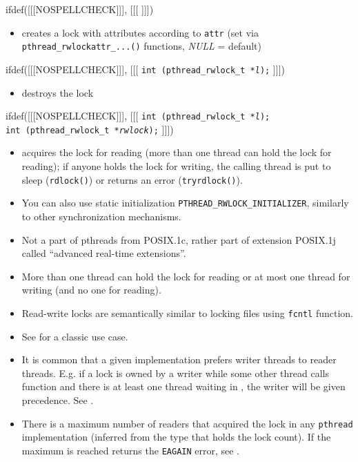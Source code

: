 \begin{slide}
\prgchars
ifdef([[[NOSPELLCHECK]]], [[[
]]])
\begin{itemize}
\item creates a lock with attributes according to \texttt{attr}
(set via \texttt{pthread\_rwlockattr\_...()} functions, \emph{NULL} = default)
\end{itemize}
ifdef([[[NOSPELLCHECK]]], [[[
\texttt{int (pthread\_rwlock\_t *\emph{l});}
]]])
\begin{itemize}
\item destroys the lock
\end{itemize}
ifdef([[[NOSPELLCHECK]]], [[[
\texttt{int (pthread\_rwlock\_t *\emph{l});}\\
\texttt{int (pthread\_rwlock\_t *\emph{rwlock});}
]]])
\begin{itemize}
\item acquires the lock for reading (more than one thread can hold the lock
for reading); if anyone holds the lock for writing, the calling thread is put
to sleep (\texttt{rdlock()}) or returns an error (\texttt{tryrdlock()}).
\end{itemize}
\end{slide}


\begin{itemize}
\item You can also use static initialization
\texttt{PTHREAD\_RWLOCK\_INITIALIZER}, similarly to other synchronization
mechanisms.
\item Not a part of pthreads from POSIX.1c, rather part of extension POSIX.1j
called ``advanced real-time extensions''.
\item More than one thread can hold the lock for reading or at most one
thread for writing (and no one for reading).
\item Read-write locks are semantically similar to locking files using
\texttt{fcntl} function.
\item See  for a classic use case.
\item It is common that a given implementation prefers writer threads to
reader threads.  E.g. if a lock is owned by a writer while some other thread
calls function  and there is at least one thread
waiting in , the writer will be given precedence.
See .
\item There is a maximum number of readers that acquired the lock in any
\texttt{pthread} implementation (inferred from the type that holds the lock
count). If the maximum is reached  returns the
\texttt{EAGAIN} error, see .
\end{itemize}

